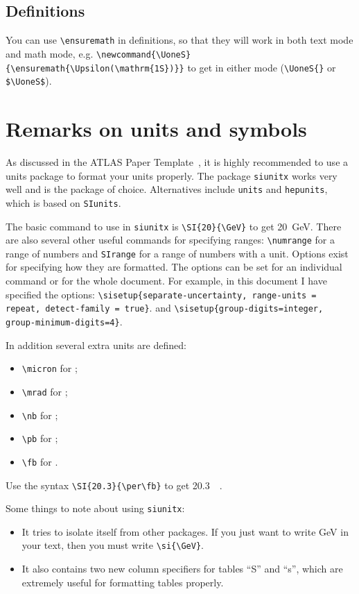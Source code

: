 \documentclass[koma,UKenglish]{style/atlasdoc}
\begin{document}
\subsection{Definitions}

You can use \verb|\ensuremath| in definitions, so that they will work
in both text mode and math mode, e.g.
\verb|\newcommand{\UoneS}{\ensuremath{\Upsilon(\mathrm{1S})}}| to get
\UoneS{} in either mode (\verb|\UoneS{}| or \verb|$\UoneS$|).


\section{Remarks on units and symbols}

As discussed in the ATLAS Paper Template~\cite{atlas-paper},
it is highly recommended to use a units package to format your units properly.
The package \texttt{siunitx} works very well and is the package of choice.
Alternatives include \texttt{units} and \texttt{hepunits},
which is based on \texttt{SIunits}.

The basic command to use in \texttt{siunitx} is \verb|\SI{20}{\GeV}| to get
\SI{20}{\GeV}. 
There are also several other useful commands for specifying ranges:
\verb|\numrange| for a range of numbers and \verb|SIrange| for a range of numbers with a unit. 
Options exist for specifying how they are formatted.
The options can be set for an individual command or for the whole document.
For example, in this document I have specified the options:
\verb|\sisetup{separate-uncertainty, range-units = repeat, detect-family = true}|.
and
\verb|\sisetup{group-digits=integer, group-minimum-digits=4}|.

In addition several extra units are defined:
\begin{itemize}
\item \verb|\micron| for \si{\micron};
\item \verb|\mrad| for \si{\mrad};
\item \verb|\nb| for \si{\nb};
\item \verb|\pb| for \si{\pb};
\item \verb|\fb| for \si{\fb}.
\end{itemize}
Use the syntax \verb|\SI{20.3}{\per\fb}| to get \SI{20.3}{\per\fb}.

Some things to note about using \texttt{siunitx}:
\begin{itemize}
\item It tries to isolate itself from other packages.
	If you just want to write \si{\GeV} in your text,
	then you must write \verb|\si{\GeV}|.
\item It also contains two new column specifiers for tables ``S'' and ``s'',
	which are extremely useful for formatting tables properly.
\end{itemize}
\end{document}
